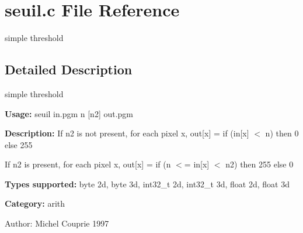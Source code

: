 \section{seuil.c File Reference}
\label{seuil_8c}
simple threshold 



\subsection{Detailed Description}
simple threshold 

{\bf Usage:} seuil in.pgm n [n2] out.pgm

{\bf Description:} If n2 is not present, for each pixel x, out[x] = if (in[x] $<$ n) then 0 else 255

If n2 is present, for each pixel x, out[x] = if (n $<$= in[x] $<$ n2) then 255 else 0

{\bf Types supported:} byte 2d, byte 3d, int32\_\-t 2d, int32\_\-t 3d, float 2d, float 3d

{\bf Category:} arith

\begin{Desc}
\item[Author:]Michel Couprie 1997 \end{Desc}
